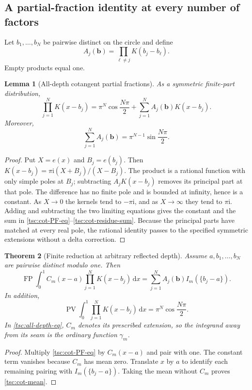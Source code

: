 \documentclass[11pt]{article}
\numberwithin{equation}{section}
\newtheorem{theorem}{Theorem}[section]
\newtheorem{lemma}[theorem]{Lemma}
\theoremstyle{definition}\newtheorem{definition}[theorem]{Definition}
\theoremstyle{remark}\newtheorem{remark}[theorem]{Remark}
\DeclareMathOperator{\FP}{FP}
\DeclareMathOperator{\PV}{PV}
\newcommand{\ii}{\mathrm i}
\newcommand{\dd}{\,\mathrm d}
\begin{document}
\subsection{A partial-fraction identity at every number of factors}
Let $b_1,\ldots,b_N$ be pairwise distinct on the circle and define
\begin{equation}\label{tsc:Acot}
 A_j(\mathbf b)=\prod_{\ell\ne j}K(b_j-b_\ell).
\end{equation}
Empty products equal one.
\begin{lemma}[All-depth cotangent partial fractions]\label{tsc:cot-PF}
As a symmetric finite-part distribution,
\begin{equation}\label{tsc:cot-PF-eq}
 \prod_{j=1}^N K(x-b_j)
     =\pi^N\cos\frac{N\pi}{2}
        +\sum_{j=1}^NA_j(\mathbf b)K(x-b_j).
\end{equation}
Moreover,
\begin{equation}\label{tsc:cot-residue-sum}
 \sum_{j=1}^NA_j(\mathbf b)=\pi^{N-1}\sin\frac{N\pi}{2}.
\end{equation}
\end{lemma}
\begin{proof}
Put $X=e(x)$ and $B_j=e(b_j)$. Then
$K(x-b_j)=\pi\ii(X+B_j)/(X-B_j)$.
The product is a rational function with only simple poles at $B_j$;
subtracting $A_jK(x-b_j)$ removes its principal part at that pole.
The difference has no finite pole and is bounded at infinity, hence is a
constant. As $X\to0$ the kernels tend to $-\pi\ii$, and as $X\to\infty$
they tend to $\pi\ii$. Adding and subtracting the two limiting equations
gives the constant and the sum in \eqref{tsc:cot-PF-eq}--\eqref{tsc:cot-residue-sum}.
Because the principal parts have matched at every real pole, the rational
identity passes to the specified symmetric extensions without a delta
correction.
\end{proof}

\begin{theorem}[Finite reduction at arbitrary reflected depth]\label{tsc:all-depth}
Assume $a,b_1,\ldots,b_N$ are pairwise distinct modulo one. Then
\begin{equation}\label{tsc:all-depth-eq}
 \boxed{\displaystyle
 \FP\int_0^1 C_m(x-a)\prod_{j=1}^NK(x-b_j)\dd x
       =\sum_{j=1}^NA_j(\mathbf b)I_m(\{b_j-a\}).}
\end{equation}
In addition,
\begin{equation}\label{tsc:cot-mean}
 \PV\int_0^1\prod_{j=1}^NK(x-b_j)\dd x
                 =\pi^N\cos\frac{N\pi}{2}.
\end{equation}
In \eqref{tsc:all-depth-eq}, $C_m$ denotes its prescribed extension, so the
integrand away from its seam is the ordinary function $\gamma_m$.
\end{theorem}
\begin{proof}
Multiply \eqref{tsc:cot-PF-eq} by $C_m(x-a)$ and pair with one. The
constant term vanishes because $C_m$ has mean zero. Translate $x$ by $a$
to identify each remaining pairing with $I_m(\{b_j-a\})$. Taking the
mean without $C_m$ proves \eqref{tsc:cot-mean}.
\end{proof}
\end{document}
